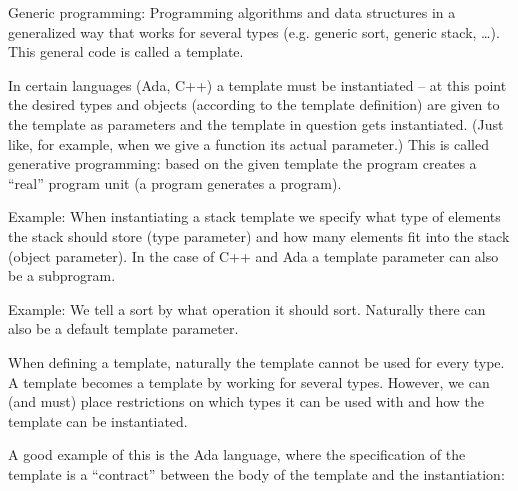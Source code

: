 \documentclass[margin=0px]{article}
\begin{document}
Generic programming: Programming algorithms and data structures in a generalized way that works for several types
(e.g. generic sort, generic stack, \ldots). This general code is called a template.

In certain languages (Ada, C++) a template must be instantiated -- at this point the desired types and objects
(according to the template definition) are given to the template as parameters and the template in question gets instantiated.
(Just like, for example, when we give a function its actual parameter.) This is called generative
programming: based on the given template the program creates a ``real'' program unit (a program
generates a program).

Example: When instantiating a stack template we specify what type of elements the stack should store (type
parameter) and how many elements fit into the stack (object parameter).
In the case of C++ and Ada a template parameter can also be a subprogram.

Example: We tell a sort by what operation it should sort.
Naturally there can also be a default template parameter.

When defining a template, naturally the template cannot be used for every type. A template becomes a template by
working for several types. However, we can (and must) place restrictions on which types
it can be used with and how the template can be instantiated.

A good example of this is the Ada language, where the specification of the template is a ``contract'' between the body of the template and the instantiation:
\end{document}
